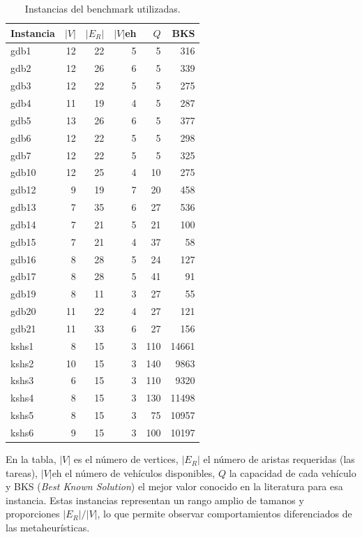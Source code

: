 \documentclass[11pt,a4paper]{article}
\theoremstyle{definition}
\theoremstyle{remark}
\begin{document}
\begin{table}[h]
\centering
\caption{Instancias del benchmark utilizadas.}
\label{tab:instancias}
\small
\begin{tabular}{lrrrrr}
\toprule
Instancia & $|V|$ & $|E_R|$ & $|V|$eh & $Q$ & BKS \\
\midrule
gdb1  & 12 & 22 & 5 &   5 &  316 \\
gdb2  & 12 & 26 & 6 &   5 &  339 \\
gdb3  & 12 & 22 & 5 &   5 &  275 \\
gdb4  & 11 & 19 & 4 &   5 &  287 \\
gdb5  & 13 & 26 & 6 &   5 &  377 \\
gdb6  & 12 & 22 & 5 &   5 &  298 \\
gdb7  & 12 & 22 & 5 &   5 &  325 \\
gdb10 & 12 & 25 & 4 &  10 &  275 \\
gdb12 & 9  & 19 & 7 &  20 &  458 \\
gdb13 & 7  & 35 & 6 &  27 &  536 \\
gdb14 & 7  & 21 & 5 &  21 &  100 \\
gdb15 & 7  & 21 & 4 &  37 &   58 \\
gdb16 & 8  & 28 & 5 &  24 &  127 \\
gdb17 & 8  & 28 & 5 &  41 &   91 \\
gdb19 & 8  & 11 & 3 &  27 &   55 \\
gdb20 & 11 & 22 & 4 &  27 &  121 \\
gdb21 & 11 & 33 & 6 &  27 &  156 \\
kshs1 & 8  & 15 & 3 & 110 & 14661 \\
kshs2 & 10 & 15 & 3 & 140 &  9863 \\
kshs3 & 6  & 15 & 3 & 110 &  9320 \\
kshs4 & 8  & 15 & 3 & 130 & 11498 \\
kshs5 & 8  & 15 & 3 &  75 & 10957 \\
kshs6 & 9  & 15 & 3 & 100 & 10197 \\
\bottomrule
\end{tabular}
\end{table}

En la tabla, $|V|$ es el número de vertices, $|E_R|$ el número de aristas
requeridas (las tareas), $|V|$eh el número de vehículos disponibles, $Q$
la capacidad de cada vehículo y BKS (\emph{Best Known Solution}) el
mejor valor conocido en la literatura para esa instancia. Estas
instancias representan un rango amplio de tamanos y proporciones
$|E_R|/|V|$, lo que permite observar comportamientos diferenciados de
las metaheurísticas.
\end{document}
